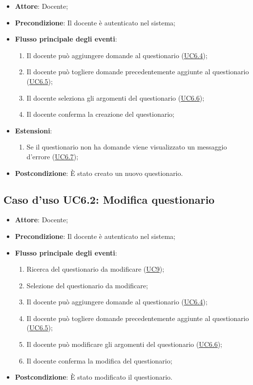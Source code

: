 \documentclass[12pt,a4paper]{article}
\begin{document}
\begin{itemize}

\item \textbf{Attore}: Docente; 
\item \textbf{Precondizione}: Il docente è autenticato nel sistema;

\item \textbf{Flusso principale degli eventi}:
\begin{enumerate}
	\item Il docente può aggiungere domande al questionario (\hyperlink{UC6.4}{UC6.4});
	\item Il docente può togliere domande precedentemente aggiunte al questionario (\hyperlink{UC6.5}{UC6.5});
	\item Il docente seleziona gli argomenti del questionario (\hyperlink{UC6.6}{UC6.6});
	\item Il docente conferma la creazione del questionario;
	
\end{enumerate}
\item \textbf{Estensioni}:
\begin{enumerate}
	\item Se il questionario non ha domande viene visualizzato un messaggio d'errore (\hyperlink{UC6.7}{UC6.7});
	
\end{enumerate}
\item \textbf{Postcondizione}: È stato creato un nuovo questionario.
\end{itemize}
\hypertarget{UC6.2}{}
\subsection{Caso d'uso UC6.2: Modifica questionario}

\begin{itemize}

\item \textbf{Attore}: Docente; 
\item \textbf{Precondizione}: Il docente è autenticato nel sistema;

\item \textbf{Flusso principale degli eventi}:
\begin{enumerate}
	\item Ricerca del questionario da modificare (\hyperlink{UC9}{UC9});
	\item Selezione del questionario da modificare;
	\item Il docente può aggiungere domande al questionario (\hyperlink{UC6.4}{UC6.4});
	\item Il docente può togliere domande precedentemente aggiunte al questionario (\hyperlink{UC6.5}{UC6.5});
	\item Il docente può modificare gli argomenti del questionario (\hyperlink{UC6.6}{UC6.6});
	\item Il docente conferma la modifica del questionario;
	
\end{enumerate}
\item \textbf{Postcondizione}: È stato modificato il questionario.
\end{itemize}
\hypertarget{UC6.3}{}
\end{document}
